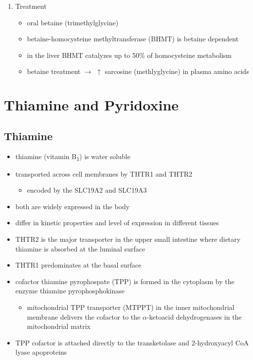 \documentclass{scrartcl}
\begin{document}
\begin{enumerate}
\item Treatment
\label{sec:orgc80df4f}
\begin{itemize}
\item oral betaine (trimethylglycine)
\item betaine-homocysteine methyltransferase (BHMT) is betaine dependent
\end{itemize}
\begin{itemize}
\item in the liver BHMT catalyzes up to 50\% of homocysteine metabolism
\item betaine treatment \(\to\) \(\uparrow\) sarcosine (methlyglycine) in plasma amino acids
\end{itemize}
\end{enumerate}

\section{Thiamine and Pyridoxine}
\label{sec:org93d6031}
\subsection{Thiamine}
\label{sec:org718f0c6}
\begin{itemize}
\item thiamine (vitamin B\textsubscript{1}) is water soluble
\item transported across cell membranes by THTR1 and THTR2
\begin{itemize}
\item encoded by the SLC19A2 and SLC19A3
\end{itemize}
\item both are widely expressed in the body
\item differ in kinetic properties and level of expression in different tissues
\item THTR2 is the major transporter in the upper small intestine where
dietary thiamine is absorbed at the luminal surface
\item THTR1 predominates at the basal surface
\item cofactor thiamine pyrophospate (TPP) is formed in the cytoplasm by
the enzyme thiamine pyrophosphokinase
\begin{itemize}
\item mitochondrial TPP transporter (MTPPT) in the inner mitochondrial membrane
delivers the cofactor to the \(\alpha\)-ketoacid dehydrogenases in the
mitochondrial matrix
\end{itemize}
\item TPP cofactor is attached directly to the transketolase and 2-hydroxyacyl CoA lyase apoproteins
\end{itemize}
\end{document}
